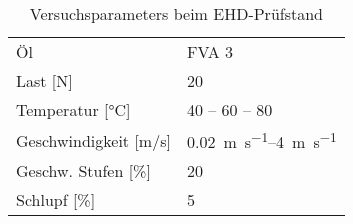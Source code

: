 \begin{table}[htbp]
    \centering
    \caption{Versuchsparameters beim EHD-Prüfstand}
    \begin{tabular}{ll}
        Öl & FVA 3 \\
        Last [\si{N}] & 20 \\
        Temperatur [\si{\degreeCelsius}] & 40 – 60 – 80 \\
        Geschwindigkeit [\si[per-mode=symbol]{\meter\per\second}] & \SIrange[per-mode=symbol]{0.02}{4}{\meter\per\second} \\
        Geschw. Stufen [\si{\%}] & 20 \\
        Schlupf [\si{\%}] & 5 \\
    \end{tabular}
    \label{tab:ehd_test_params}
\end{table}
